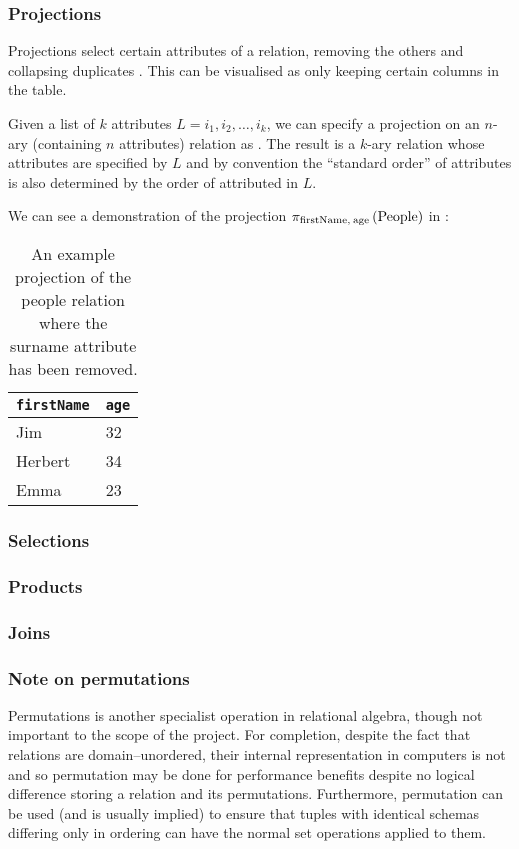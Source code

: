 \subsubsection{Projections}
Projections select certain attributes of a relation, removing the others and collapsing duplicates .\cite{RelationalModel} This can be visualised as only keeping certain columns in the table.

Given a list of $k$ attributes $L = i_1, i_2, \ldots, i_k$, we can specify a projection on an $n$-ary (containing $n$ attributes) relation  as . The result is a $k$-ary relation whose attributes are specified by $L$ \cite{RelationalModel} and by convention the ``standard order'' of attributes is also determined by the order of attributed in $L$.\cite{DatabaseSystems}

We can see a demonstration of the projection $\pi_{\mathrm{firstName,\:age}}\left(\mathrm{People}\right)$ in :
\begin{table}[h]
  \centering
  \begin{tabular}{l|l}
    \verb|firstName| & \verb|age| \\
    \hline\hline
    Jim & 32\\
    Herbert & 34\\
    Emma & 23\\
  \end{tabular}
  \caption[Projection example on People relation.]{An example projection of the people relation where the surname attribute has been removed.}
  \label{tab:peopleRelationProjection}
\end{table}
\subsubsection{Selections}
\subsubsection{Products}
\subsubsection{Joins}
\subsubsection{Note on permutations}
Permutations is another specialist operation in relational algebra, though not important to the scope of the project. For completion, despite the fact that relations are domain--unordered, their internal representation in computers is not and so permutation may be done for performance benefits despite no logical difference storing a relation and its permutations.\cite{RelationalModel} Furthermore, permutation can be used (and is usually implied) to ensure that tuples with identical schemas differing only in ordering can have the normal set operations applied to them. \cite{DatabaseSystems}